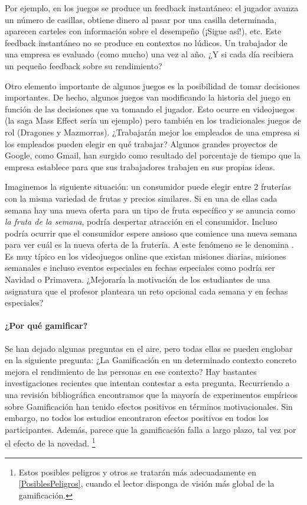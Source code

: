 Por ejemplo, en los juegos se produce un feedback instantáneo: el jugador avanza un número de casillas, obtiene dinero al pasar por una casilla determinada, aparecen carteles con información sobre el desempeño (¡Sigue así!), etc.
%
Este feedback instantáneo no se produce en contextos no lúdicos.
%
Un trabajador de una empresa es evaluado (como mucho) una vez al año. 
%
¿Y si cada día recibiera un pequeño feedback sobre su rendimiento?


Otro elemento importante de algunos juegos es la posibilidad de tomar decisiones importantes.
%
De hecho, algunos juegos van modificando la historia del juego en función de las decisiones que va tomando el jugador. 
%
Esto ocurre en videojuegos (la saga Mass Effect sería un ejemplo) pero también en los tradicionales juegos de rol (Dragones y Mazmorras).
%
¿Trabajarán mejor los empleados de una empresa si los empleados pueden elegir en qué trabajar?
%
Algunos grandes proyectos de Google, como Gmail, han surgido como resultado del porcentaje de tiempo que la empresa establece para que sus trabajadores trabajen en sus propias ideas.

Imaginemos la siguiente situación: un consumidor puede elegir entre 2 fruterías con la misma variedad de frutas y precios similares.
%
Si en una de ellas cada semana hay una nueva oferta para un tipo de fruta específico y se anuncia como \textit{la fruta de la semana}, podría despertar atracción en el consumidor. 
%
Incluso podría ocurrir que el consumidor espere ansioso que comience una nueva semana para ver cuál es la nueva oferta de la frutería.
%
A este fenómeno se le denomina . 
%
Es muy típico en los videojuegos online que existan misiones diarias, misiones semanales e incluso eventos especiales en fechas especiales como podría ser Navidad o Primavera.
%
¿Mejoraría la motivación de los estudiantes de una asignatura que el profesor planteara un reto opcional cada semana y en fechas especiales?



\paragraph{¿Por qué gamificar?} Se han dejado algunas preguntas en el aire, pero todas ellas se pueden englobar en la siguiente pregunta: ¿La Gamificación en un determinado contexto concreto mejora el rendimiento de las personas en ese contexto?
%
Hay bastantes investigaciones recientes que intentan contestar a esta pregunta.
%
Recurriendo a una revisión bibliográfica \cite{EmpiricalGamification} encontramos que la mayoría de experimentos empíricos sobre Gamificación han tenido efectos positivos en términos motivacionales.
%
Sin embargo, no todos los estudios encontraron efectos positivos en todos los participantes.
%
Además, parece que la gamificación falla a largo plazo, tal vez por el efecto de la novedad. 
%
\footnote{Estos posibles peligros y otros se tratarán más adecuadamente en \ref{PosiblesPeligros}, cuando el lector disponga de visión más global de la gamificación.}

